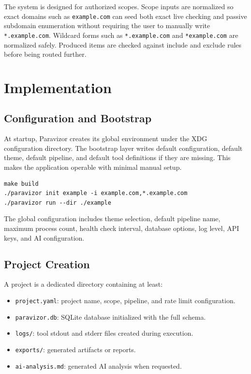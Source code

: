 \documentclass[a4paper,12pt]{article}
\begin{document}
The system is designed for authorized scopes. Scope inputs are normalized so exact domains such as \texttt{example.com} can seed both exact live checking and passive subdomain enumeration without requiring the user to manually write \texttt{*.example.com}. Wildcard forms such as \texttt{*.example.com} and \texttt{*example.com} are normalized safely. Produced items are checked against include and exclude rules before being routed further.

\newpage

\section{Implementation}

\subsection{Configuration and Bootstrap}

At startup, Paravizor creates its global environment under the XDG configuration directory. The bootstrap layer writes default configuration, default theme, default pipeline, and default tool definitions if they are missing. This makes the application operable with minimal manual setup.

\begin{lstlisting}[style=bashstyle,caption={Basic usage}]
make build
./paravizor init example -i example.com,*.example.com
./paravizor run --dir ./example
\end{lstlisting}

The global configuration includes theme selection, default pipeline name, maximum process count, health check interval, database options, log level, API keys, and AI configuration.

\subsection{Project Creation}

A project is a dedicated directory containing at least:

\begin{itemize}
    \item \texttt{project.yaml}: project name, scope, pipeline, and rate limit configuration.
    \item \texttt{paravizor.db}: SQLite database initialized with the full schema.
    \item \texttt{logs/}: tool stdout and stderr files created during execution.
    \item \texttt{exports/}: generated artifacts or reports.
    \item \texttt{ai-analysis.md}: generated AI analysis when requested.
\end{itemize}
\end{document}
